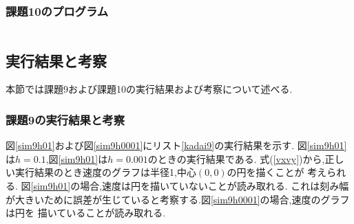 \documentclass[a4j]{jarticle}
\begin{document}
      \subsubsection{課題10のプログラム}
      \begin{lstlisting}[basicstyle=\ttfamily\footnotesize, frame=single,label=kadai10,caption=課題10のコード]
      \end{lstlisting}

      \subsection{実行結果と考察}
      本節では課題9および課題10の実行結果および考察について述べる.
      \subsubsection{課題9の実行結果と考察}
      図\ref{sim9h01}および図\ref{sim9h0001}にリスト\ref{kadai9}の実行結果を示す.
      図\ref{sim9h01}は$h=0.1$,図\ref{sim9h01}は$h=0.001$のときの実行結果である.
      式(\ref{vxvy})から,正しい実行結果のとき速度のグラフは半径1,中心$(0,0)$の円を描くことが
      考えられる. 図\ref{sim9h01}の場合,速度は円を描いていないことが読み取れる.
      これは刻み幅が大きいために誤差が生じていると考察する.図\ref{sim9h0001}の場合,速度のグラフは円を
      描いていることが読み取れる.
\end{document}
